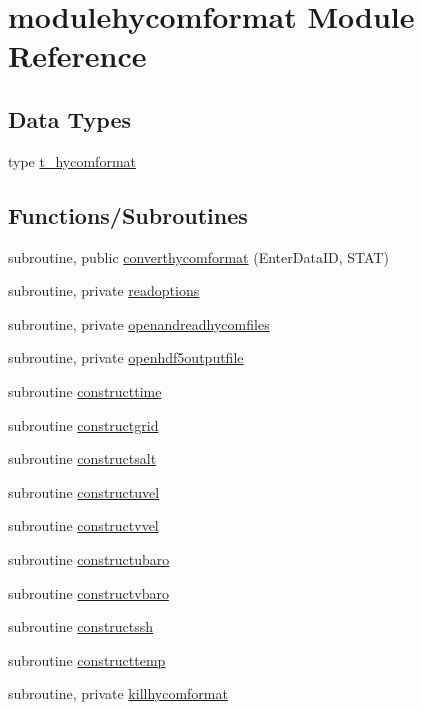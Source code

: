\hypertarget{namespacemodulehycomformat}{}\section{modulehycomformat Module Reference}
\label{namespacemodulehycomformat}
\subsection*{Data Types}
\begin{DoxyCompactItemize}
\item 
type \mbox{\hyperlink{structmodulehycomformat_1_1t__hycomformat}{t\+\_\+hycomformat}}
\end{DoxyCompactItemize}
\subsection*{Functions/\+Subroutines}
\begin{DoxyCompactItemize}
\item 
subroutine, public \mbox{\hyperlink{namespacemodulehycomformat_a75ba9ace07164a1aac61c55e48af9959}{converthycomformat}} (Enter\+Data\+ID, S\+T\+AT)
\item 
subroutine, private \mbox{\hyperlink{namespacemodulehycomformat_ad11177b2f2e56107ff56b45f4e7e04ef}{readoptions}}
\item 
subroutine, private \mbox{\hyperlink{namespacemodulehycomformat_acba9e941ba6903be2a19cdc9e036cd64}{openandreadhycomfiles}}
\item 
subroutine, private \mbox{\hyperlink{namespacemodulehycomformat_a87713c6e54c1c8b7b1a0fd423c3a6acf}{openhdf5outputfile}}
\item 
subroutine \mbox{\hyperlink{namespacemodulehycomformat_ad9fbb9adf5d36be1834e3ca02dacbd89}{constructtime}}
\item 
subroutine \mbox{\hyperlink{namespacemodulehycomformat_a9517a6d8966a57eda71abf77acd790cb}{constructgrid}}
\item 
subroutine \mbox{\hyperlink{namespacemodulehycomformat_a4e0166792e4a82d98b34a54327ca161b}{constructsalt}}
\item 
subroutine \mbox{\hyperlink{namespacemodulehycomformat_a9e6467cf7daa8b6be0aef68805d1ab7c}{constructuvel}}
\item 
subroutine \mbox{\hyperlink{namespacemodulehycomformat_aab97b75b8e514c72a0dbade3a8884e90}{constructvvel}}
\item 
subroutine \mbox{\hyperlink{namespacemodulehycomformat_a781579f6c0af167e5857fa0b7f9caf6a}{constructubaro}}
\item 
subroutine \mbox{\hyperlink{namespacemodulehycomformat_a26be9ece61892ddfd2166afbb12b8b28}{constructvbaro}}
\item 
subroutine \mbox{\hyperlink{namespacemodulehycomformat_accd71877c333ad8cebf0e4bd5b0f16d1}{constructssh}}
\item 
subroutine \mbox{\hyperlink{namespacemodulehycomformat_a9e994c5d27c453fa808543d635fb116e}{constructtemp}}
\item 
subroutine, private \mbox{\hyperlink{namespacemodulehycomformat_aa2e49450c9d2acce5c240fae7e58eb05}{killhycomformat}}
\end{DoxyCompactItemize}
